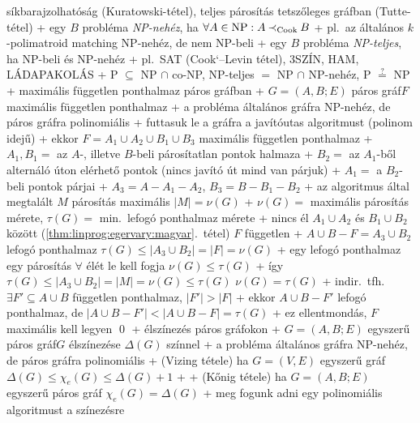         síkbarajzolhatóság (Kuratowski-tétel), teljes párosítás
        tetszőleges gráfban (Tutte-tétel)
    + egy $B$ probléma \emph{NP-nehéz}, ha $\forall A \in
      \mathrm{NP}: A \mathbin{{\prec}_{\textrm{Cook}}} B$
      + pl.~az általános $k$-polimatroid matching NP-nehéz, de nem
        NP-beli
    + egy $B$ probléma \emph{NP-teljes}, ha NP-beli és NP-nehéz
      + pl.~SAT (Cook`--Levin tétel), 3SZÍN, HAM, LÁDAPAKOLÁS
  + P $\subseteq$ NP $\cap$ co-NP, NP-teljes $=$ NP $\cap$ NP-nehéz, P
    $\overset{?}{=}$ NP
+ \prob maximális független ponthalmaz páros gráfban
  + \DataIn $G = (A, B; E)$ páros gráf\qquad\DataOut $F$ maximális
    független ponthalmaz
  + a probléma általános gráfra NP-nehéz, de páros gráfra polinomiális
  + futtasuk le a gráfra a javítóutas algoritmust (polinom idejű)
  + \stmnt ekkor $F = A_1 \cup A_2 \cup B_1 \cup B_3$ maximális
    független ponthalmaz
    + $A_1, B_1 =$ az $A$-, illetve $B$-beli párosítatlan pontok
      halmaza
    + $B_2 =$ az $A_1$-ből alternáló úton elérhető pontok (nincs
      javító út \RA mind van párjuk)
    + $A_1 =$ a $B_2$-beli pontok párjai
    + $A_3 = A - A_1 - A_2$, $B_3 = B - B_1 - B_2$
    + \proof az algoritmus által megtalált $M$ párosítás maximális \RA%
      $\lvert M \rvert = \nu(G)$
      + $\nu(G) =$ maximális párosítás mérete, $\tau(G) =$ min.~lefogó
        ponthalmaz mérete
      + nincs él $A_1 \cup A_2$ és $B_1 \cup B_2$ között
        (\ref{thm:linprog:egervary:magyar}.~tétel) \RA $F$ független
      + $A \cup B - F = A_3 \cup B_2$ lefogó ponthalmaz \RA $\tau(G)
        \le \lvert A_3 \cup B_2 \rvert = \lvert F \rvert = \nu(G)$
      + egy lefogó ponthalmaz egy párosítás $\forall$ élét le kell
        fogja \RA $\nu(G) \le \tau(G)$
      + így $\tau(G) \le \lvert A_3 \cup B_2 \rvert = \lvert M \rvert
        = \nu(G) \le \tau(G)$ \RA $\nu(G) = \tau(G)$
    + indir.~tfh.~$\exists F' \subseteq A \cup B$ független
      ponthalmaz, $\lvert F' \rvert > \lvert F \rvert$
      + ekkor $A \cup B - F'$ lefogó ponthalmaz, de $\lvert A \cup B -
        F' \rvert < \lvert A \cup B - F \rvert = \tau(G)$
      + ez ellentmondás, $F$ maximális kell legyen \qed
+ \prob élszínezés páros gráfokon
  + \DataIn $G = (A, B; E)$ egyszerű páros gráf\qquad\DataOut $G$ élszínezése
    $\Delta(G)$ színnel
  + a probléma általános gráfra NP-nehéz, de páros gráfra polinomiális
  + \thm \label{thm:kozelito:additiv:vizing}(Vizing tétele) ha $G = (V, E)$ egyszerű gráf \RA $\Delta(G)
    \le \chi_e(G) \le \Delta(G) + 1$
    + \noproof
  + \thm (Kőnig tétele) ha $G = (A, B; E)$ egyszerű páros gráf \RA%
    $\chi_e(G) = \Delta(G)$
    + \proof meg fogunk adni egy polinomiális algoritmust a színezésre
